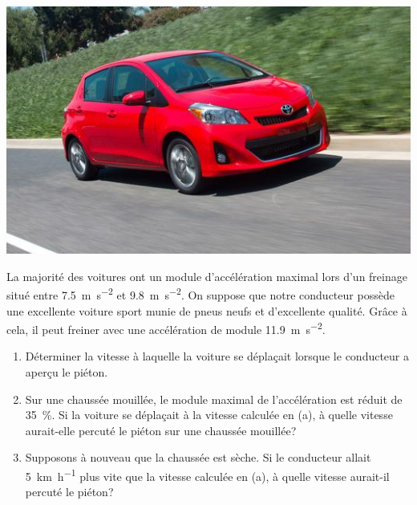 \documentclass{tufte-handout}
\begin{document}
\begin{marginfigure}
  \includegraphics[scale=0.3]{2012toyota_yaris.jpg}
  \caption{Une Toyota Yaris 2012 peut freiner avec une accélération de
    module \SI{9.29}{\meter\per\second\squared}.  Les modèles plus lourds,
    comme la Prius V 2013 n'atteignent que des accélérations de module
    \SI{8.41}{\meter\per\second\squared}.}
  \label{fig:porsche}
\end{marginfigure}

La majorité des voitures ont un module d'accélération maximal lors
d'un freinage situé entre \SI{7.5}{\meter\per\second\squared} et
\SI{9.8}{\meter\per\second\squared}.  On suppose que notre conducteur possède
une excellente voiture sport munie de pneus neufs et d'excellente qualité.
Grâce à cela, il peut freiner avec une accélération de module
\SI{11.9}{\meter\per\second\squared}.

\begin{enumerate}[a]
  \item Déterminer la vitesse à laquelle la voiture se déplaçait
    lorsque le conducteur a aperçu le piéton.
  \item Sur une chaussée mouillée, le module maximal de l'accélération est
    réduit de \SI{35}{\percent}.  Si la voiture se déplaçait à la vitesse
    calculée en (a), à quelle vitesse aurait-elle percuté le piéton sur une
    chaussée mouillée?
  \item Supposons à nouveau que la chaussée est sèche.  Si le conducteur allait
    \SI{5}{\kilo\meter\per\hour} plus vite que la vitesse calculée en (a), à
    quelle vitesse aurait-il percuté le piéton?
\end{enumerate}

\end{document}
